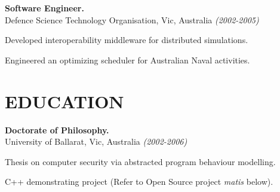 \documentclass[margin]{res}
\begin{document}
\begin{resume}
{\bf Software Engineer.} \\
Defence Science Technology Organisation, Vic, Australia {\em (2002-2005)}
\begin{list}{}{\leftmargin=1.5em \topsep=5pt \partopsep=0pt \parsep=2.5pt}
  \item Developed interoperability middleware for distributed simulations.
  \item Engineered an optimizing scheduler for Australian Naval activities.
\end{list}






\section{EDUCATION}

{\bf Doctorate of Philosophy.} \\
University of Ballarat, Vic, Australia {\em (2002-2006)}
\begin{list}{}{\leftmargin=1.5em \topsep=5pt \partopsep=0pt \parsep=2.5pt}
  \item Thesis on computer security via abstracted program behaviour modelling.
  \item C++ demonstrating project (Refer to Open Source project {\em
    matis} below).
\end{list}


\end{resume}
\end{document}
